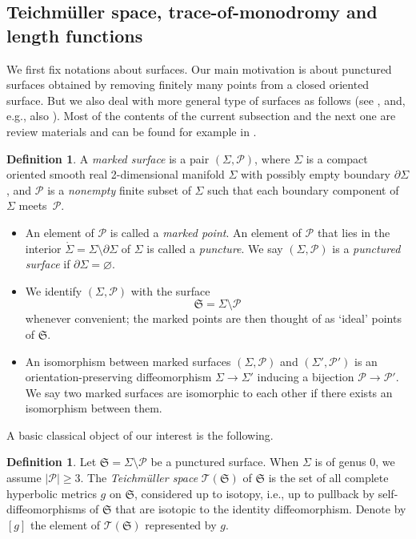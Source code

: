 \documentclass[pdftex]{sigma}
\numberwithin{equation}{section}
\theoremstyle{definition}
\newtheorem{Definition}[Theorem]{Definition}
\begin{document}
\subsection{Teichm\"uller space, trace-of-monodromy and length functions}
\label{subsec:Teichmuller_space}
We first fix notations about surfaces. Our main motivation is about punctured surfaces obtained by removing finitely many points from a closed oriented surface. But we also deal with more general type of surfaces as follows (see \cite{FG06}, and, e.g., also \cite{Le19}). Most of the contents of the current subsection and the next one are review materials and can be found for example in \cite{P12}.
\begin{Definition}
\label{def:generalized_marked_surface}
A {\em marked surface} is a pair $(\Sigma,\mathcal{P})$, where $\Sigma$ is a compact oriented smooth real 2-dimensional manifold $\Sigma$ with possibly empty boundary $\partial \Sigma$, and $\mathcal{P}$ is a {\it nonempty} finite subset of $\Sigma$ such that each boundary component of~$\Sigma$ meets~$\mathcal{P}$.
\begin{itemize}\itemsep=0pt
\item An element of $\mathcal{P}$ is called a {\em marked point}. An element of $\mathcal{P}$ that lies in the interior $\mathring{\Sigma} = \Sigma\setminus\partial \Sigma$ of $\Sigma$ is called a {\em puncture}. We say $(\Sigma,\mathcal{P})$ is a {\em punctured surface} if $\partial \Sigma = \varnothing $.
\item We identify $(\Sigma,\mathcal{P})$ with the surface
\[
\mathfrak{S} = \Sigma\setminus \mathcal{P}
\]
whenever convenient; the marked points are then thought of as `ideal' points of $\mathfrak{S}$.
\item An isomorphism between marked surfaces $(\Sigma,\mathcal{P})$ and $(\Sigma',\mathcal{P}')$ is an orientation-preserving diffeomorphism $\Sigma \to \Sigma'$ inducing a bijection $\mathcal{P} \to \mathcal{P}'$. We say two marked surfaces are isomorphic to each other if there exists an isomorphism between them.
\end{itemize}
\end{Definition}
A basic classical object of our interest is the following.
\begin{Definition}
\label{def:Teichmuller_space}
Let $\mathfrak{S} = \Sigma \setminus \mathcal{P}$ be a punctured surface. When $\Sigma$ is of genus $0$, we assume $|\mathcal{P}|\ge 3$.
The {\em Teichm\"uller space} $\mathscr{T}(\mathfrak{S})$ of $\mathfrak{S}$ is the set of all complete hyperbolic metrics $g$ on $\mathfrak{S}$, considered up to isotopy, i.e., up to pullback by self-diffeomorphisms of $\mathfrak{S}$ that are isotopic to the identity diffeomorphism. Denote by $[g]$ the element of $\mathscr{T}(\mathfrak{S})$ represented by $g$.
\end{Definition}
\end{document}
